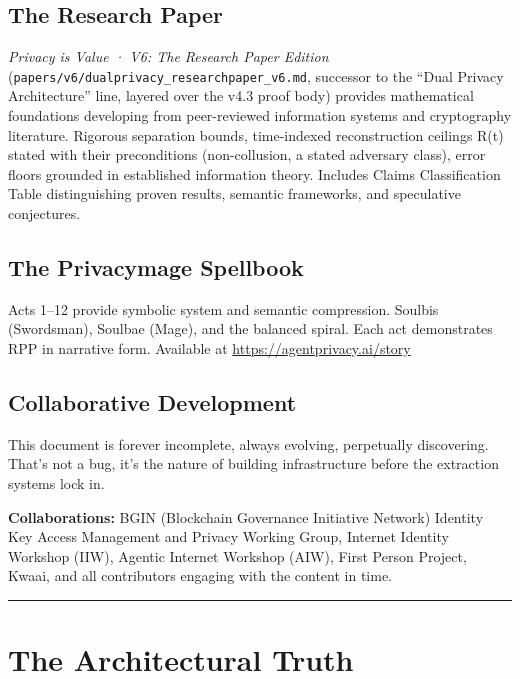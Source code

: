 \documentclass[
]{article}
\begin{document}
\subsection{The Research Paper}\label{the-research-paper}

\emph{Privacy is Value · V6: The Research Paper Edition}
(\texttt{papers/v6/dualprivacy\_researchpaper\_v6.md}, successor to the
``Dual Privacy Architecture'' line, layered over the v4.3 proof body)
provides mathematical foundations developing from peer-reviewed
information systems and cryptography literature. Rigorous separation
bounds, time-indexed reconstruction ceilings R(t) stated with their
preconditions (non-collusion, a stated adversary class), error floors
grounded in established information theory. Includes Claims
Classification Table distinguishing proven results, semantic frameworks,
and speculative conjectures.

\subsection{The Privacymage Spellbook}\label{the-privacymage-spellbook}

Acts 1--12 provide symbolic system and semantic compression. Soulbis
(Swordsman), Soulbae (Mage), and the balanced spiral. Each act
demonstrates RPP in narrative form. Available at
\url{https://agentprivacy.ai/story}

\subsection{Collaborative Development}\label{collaborative-development}

This document is forever incomplete, always evolving, perpetually
discovering. That's not a bug, it's the nature of building
infrastructure before the extraction systems lock in.

\textbf{Collaborations:} BGIN (Blockchain Governance Initiative Network)
Identity Key Access Management and Privacy Working Group, Internet
Identity Workshop (IIW), Agentic Internet Workshop (AIW), First Person
Project, Kwaai, and all contributors engaging with the content in time.

\begin{center}\rule{0.5\linewidth}{0.5pt}\end{center}

\section{The Architectural Truth}\label{the-architectural-truth}
\end{document}
